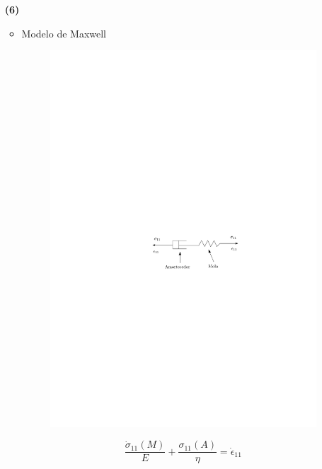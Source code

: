 \documentclass[a4paper, 12pt, brazilian]{article}
\begin{document}
\begin{itemize}
		\item[\textbf{(6)}]	
		
		\begin{itemize}
			\item Modelo de Maxwell	
			\begin{figure}[H]
				\centering
				\includegraphics[scale=1.1]{images/maxwell}
			\end{figure}
			
			\begin{equation}
			\dfrac{\dot{\sigma}_{11}(M)}{E}+\dfrac{\sigma_{11}(A)}{\eta}=\dot{\epsilon}_{11}
			\end{equation}
			

\end{itemize}
\end{itemize}
\end{document}
